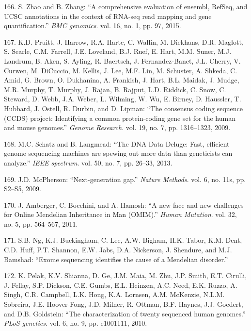 \documentclass[12pt,a4paper,twoside]{ugathesis}
\theoremstyle{definition}
\theoremstyle{definition}
\theoremstyle{definition}
\theoremstyle{remark}
\begin{document}
\hypertarget{ref-Zhao2015}{}
166. S. Zhao and B. Zhang: ``A comprehensive evaluation of ensembl,
RefSeq, and UCSC annotations in the context of RNA-seq read mapping and
gene quantification.'' \emph{BMC genomics}. vol. 16, no. 1, pp. 97,
2015.

\hypertarget{ref-Pruitt2009}{}
167. K.D. Pruitt, J. Harrow, R.A. Harte, C. Wallin, M. Diekhans, D.R.
Maglott, S. Searle, C.M. Farrell, J.E. Loveland, B.J. Ruef, E. Hart,
M.M. Suner, M.J. Landrum, B. Aken, S. Ayling, R. Baertsch, J.
Fernandez-Banet, J.L. Cherry, V. Curwen, M. DiCuccio, M. Kellis, J. Lee,
M.F. Lin, M. Schuster, A. Shkeda, C. Amid, G. Brown, O. Dukhanina, A.
Frankish, J. Hart, B.L. Maidak, J. Mudge, M.R. Murphy, T. Murphy, J.
Rajan, B. Rajput, L.D. Riddick, C. Snow, C. Steward, D. Webb, J.A.
Weber, L. Wilming, W. Wu, E. Birney, D. Haussler, T. Hubbard, J. Ostell,
R. Durbin, and D. Lipman: ``The consensus coding sequence (CCDS)
project: Identifying a common protein-coding gene set for the human and
mouse genomes.'' \emph{Genome Research}. vol. 19, no. 7, pp. 1316--1323,
2009.

\hypertarget{ref-Schatz2013}{}
168. M.C. Schatz and B. Langmead: ``The DNA Data Deluge: Fast, efficient
genome sequencing machines are spewing out more data than geneticists
can analyze.'' \emph{IEEE spectrum}. vol. 50, no. 7, pp. 26--33, 2013.

\hypertarget{ref-McPherson2009}{}
169. J.D. McPherson: ``Next-generation gap.'' \emph{Nature Methods}.
vol. 6, no. 11s, pp. S2--S5, 2009.

\hypertarget{ref-Amberger2011}{}
170. J. Amberger, C. Bocchini, and A. Hamosh: ``A new face and new
challenges for Online Mendelian Inheritance in Man (OMIM).'' \emph{Human
Mutation}. vol. 32, no. 5, pp. 564--567, 2011.

\hypertarget{ref-Ng}{}
171. S.B. Ng, K.J. Buckingham, C. Lee, A.W. Bigham, H.K. Tabor, K.M.
Dent, C.D. Huff, P.T. Shannon, E.W. Jabs, D.A. Nickerson, J. Shendure,
and M.J. Bamshad: ``Exome sequencing identifies the cause of a Mendelian
disorder.''

\hypertarget{ref-Pelak2010}{}
172. K. Pelak, K.V. Shianna, D. Ge, J.M. Maia, M. Zhu, J.P. Smith, E.T.
Cirulli, J. Fellay, S.P. Dickson, C.E. Gumbs, E.L. Heinzen, A.C. Need,
E.K. Ruzzo, A. Singh, C.R. Campbell, L.K. Hong, K.A. Lornsen, A.M.
McKenzie, N.L.M. Sobreira, J.E. Hoover-Fong, J.D. Milner, R. Ottman,
B.F. Haynes, J.J. Goedert, and D.B. Goldstein: ``The characterization of
twenty sequenced human genomes.'' \emph{PLoS genetics}. vol. 6, no. 9,
pp. e1001111, 2010.
\end{document}
